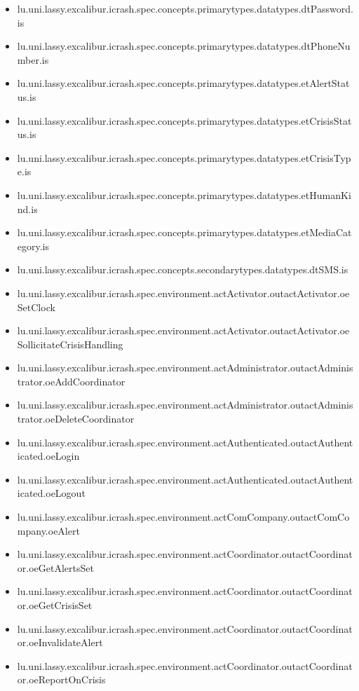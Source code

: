 \begin{itemize}
\item lu.uni.lassy.excalibur.icrash.spec.concepts.primarytypes.datatypes.dtPassword.is 
\item lu.uni.lassy.excalibur.icrash.spec.concepts.primarytypes.datatypes.dtPhoneNumber.is 
\item lu.uni.lassy.excalibur.icrash.spec.concepts.primarytypes.datatypes.etAlertStatus.is 
\item lu.uni.lassy.excalibur.icrash.spec.concepts.primarytypes.datatypes.etCrisisStatus.is 
\item lu.uni.lassy.excalibur.icrash.spec.concepts.primarytypes.datatypes.etCrisisType.is 
\item lu.uni.lassy.excalibur.icrash.spec.concepts.primarytypes.datatypes.etHumanKind.is 
\item lu.uni.lassy.excalibur.icrash.spec.concepts.primarytypes.datatypes.etMediaCategory.is 
\item lu.uni.lassy.excalibur.icrash.spec.concepts.secondarytypes.datatypes.dtSMS.is 
\item lu.uni.lassy.excalibur.icrash.spec.environment.actActivator.outactActivator.oeSetClock 
\item lu.uni.lassy.excalibur.icrash.spec.environment.actActivator.outactActivator.oeSollicitateCrisisHandling 
\item lu.uni.lassy.excalibur.icrash.spec.environment.actAdministrator.outactAdministrator.oeAddCoordinator 
\item lu.uni.lassy.excalibur.icrash.spec.environment.actAdministrator.outactAdministrator.oeDeleteCoordinator 
\item lu.uni.lassy.excalibur.icrash.spec.environment.actAuthenticated.outactAuthenticated.oeLogin 
\item lu.uni.lassy.excalibur.icrash.spec.environment.actAuthenticated.outactAuthenticated.oeLogout 
\item lu.uni.lassy.excalibur.icrash.spec.environment.actComCompany.outactComCompany.oeAlert 
\item lu.uni.lassy.excalibur.icrash.spec.environment.actCoordinator.outactCoordinator.oeGetAlertsSet 
\item lu.uni.lassy.excalibur.icrash.spec.environment.actCoordinator.outactCoordinator.oeGetCrisisSet 
\item lu.uni.lassy.excalibur.icrash.spec.environment.actCoordinator.outactCoordinator.oeInvalidateAlert 
\item lu.uni.lassy.excalibur.icrash.spec.environment.actCoordinator.outactCoordinator.oeReportOnCrisis 

\end{itemize}
